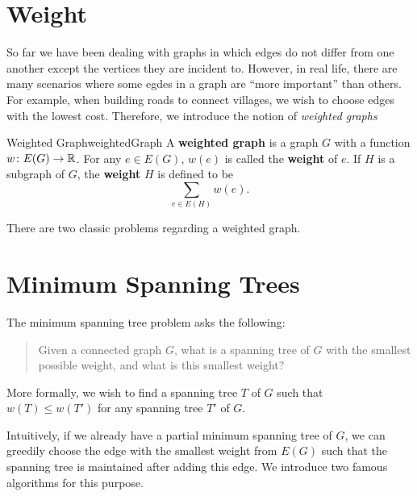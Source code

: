 \documentclass[math]{amznotes}
\theoremstyle{remark}
\begin{document}
\section{Weight}
So far we have been dealing with graphs in which edges do not differ from one another except the vertices they are incident to. However, in real life, there are many scenarios where some egdes in a graph are ``more important'' than others. For example, when building roads to connect villages, we wish to choose edges with the lowest cost. Therefore, we introduce the notion of \textit{weighted graphs}
\begin{dfnbox}{Weighted Graph}{weightedGraph}
    A {\color{red} \textbf{weighted graph}} is a graph $G$ with a function $w \colon E(G) \to \mathbb{R}$. For any $e \in E(G)$, $w(e)$ is called the {\color{red} \textbf{weight}} of $e$. If $H$ is a subgraph of $G$, the {\color{red} \textbf{weight}} $H$ is defined to be
    \begin{equation*}
        \sum_{e \in E(H)}w(e).
    \end{equation*}
\end{dfnbox}
There are two classic problems regarding a weighted graph.
\section{Minimum Spanning Trees}
The minimum spanning tree problem asks the following:
\begin{quote}
    Given a connected graph $G$, what is a spanning tree of $G$ with the smallest possible weight, and what is this smallest weight?
\end{quote}
More formally, we wish to find a spanning tree $T$ of $G$ such that $w(T) \leq w(T')$ for any spanning tree $T'$ of $G$.

Intuitively, if we already have a partial minimum spanning tree of $G$, we can greedily choose the edge with the smallest weight from $E(G)$ such that the spanning tree is maintained after adding this edge. We introduce two famous algorithms for this purpose.
\end{document}
